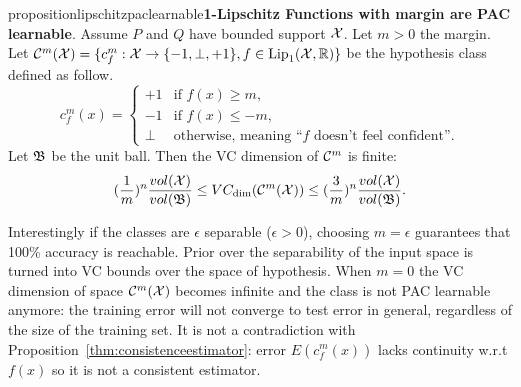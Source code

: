         \begin{restatable}{proposition}{lipschitzpaclearnable}{\normalfont\textbf{1-Lipschitz Functions with margin are PAC learnable}.}\label{thm:lipschitzpaclearnable}
            Assume $P$ and $Q$ have bounded support $\mathcal{X}$. Let $m>0$ the margin. Let $\mathcal{C}^m(\mathcal{X})=\{c^m_f:\mathcal{X}\rightarrow\{-1,\bot,+1\},f\in\text{Lip}_1(\mathcal{X},\mathbb{R})\}$ be the hypothesis class defined as follow.
            \begin{equation}
                c^m_f(x)=\begin{cases}
                        +1& \text{if } f(x)\geq m,\\
                        -1& \text{if } f(x)\leq -m,\\
                        \bot& \text{otherwise, meaning ``$f$ doesn't feel confident''.}
                \end{cases}
            \end{equation}
                Let $\mathfrak{B}$ be the unit ball. Then the VC dimension of $\mathcal{C}^m$ is finite:
                \begin{equation}
                    (\frac{1}{m})^n\frac{vol(\mathcal{X})}{vol(\mathfrak{B})}\leq VC_{\text{dim}}(\mathcal{C}^m(\mathcal{X}))\leq (\frac{3}{m})^n\frac{vol(\mathcal{X})}{vol(\mathfrak{B})}.
            \end{equation}
        \end{restatable}
          
        Interestingly if the classes are $\epsilon$ separable ($\epsilon>0$), choosing $m=\epsilon$ guarantees that 100\% accuracy is reachable. Prior over the separability of the input space is turned into VC bounds over the space of hypothesis. When $m=0$ the VC dimension of space $\mathcal{C}^m(\mathcal{X})$ becomes infinite and the class is not PAC learnable anymore: the training error will not converge to test error in general, regardless of the size of the training set. It is not a contradiction with Proposition~\ref{thm:consistenceestimator}: error $E(c^m_f(x))$ lacks continuity w.r.t $f(x)$ so it is not a consistent estimator.   
          
